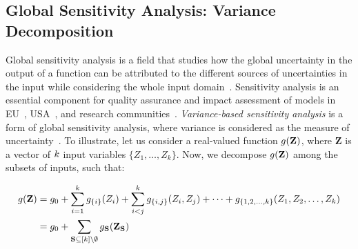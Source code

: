 

\subsection{Global Sensitivity Analysis: Variance Decomposition}
Global sensitivity analysis is a field that studies how the global uncertainty in the output of a function can be attributed to the different sources of uncertainties in the input while considering the whole input domain~\cite{saltelli2008global}.
Sensitivity analysis is an essential component for quality assurance and impact assessment of models in EU~\cite{eu}, USA~\cite{usepa}, and research communities~\cite{saltelli2020five}.
\emph{Variance-based sensitivity analysis} is a form of global sensitivity analysis, where variance is considered as the measure of uncertainty~\cite{sobol1990sensitivity,sobol2001global}. To illustrate, let us consider a real-valued function $  g(\mathbf{Z}) $, where $ \mathbf{Z} $ is a vector of $ k $ input variables $ \{Z_1, \dots, Z_k\} $. Now, we decompose $ g(\mathbf{Z}) $ among the subsets of inputs, such that:

\begin{align}
	\function(\mathbf{Z}) &= \function_0 + \sum_{i=1}^{\numnonsensitive} \function_{\{i\}}(Z_i) +  \sum_{i < j}^{\numnonsensitive} \function_{\{i,j\}}(Z_i, Z_j)  + \cdots  + \function_{\{1, 2, \dots, \numnonsensitive\}} (Z_1, Z_2, \dots, Z_{\numnonsensitive})\notag%
	\\    
	&= \function_0 +  \sum_{\mathbf{S} \subseteq [\numnonsensitive] \setminus \emptyset} \function_{\mathbf{S}}(\mathbf{Z}_{\mathbf{S}})\label{eq:functional_decomposition_set_notation}
\end{align}

